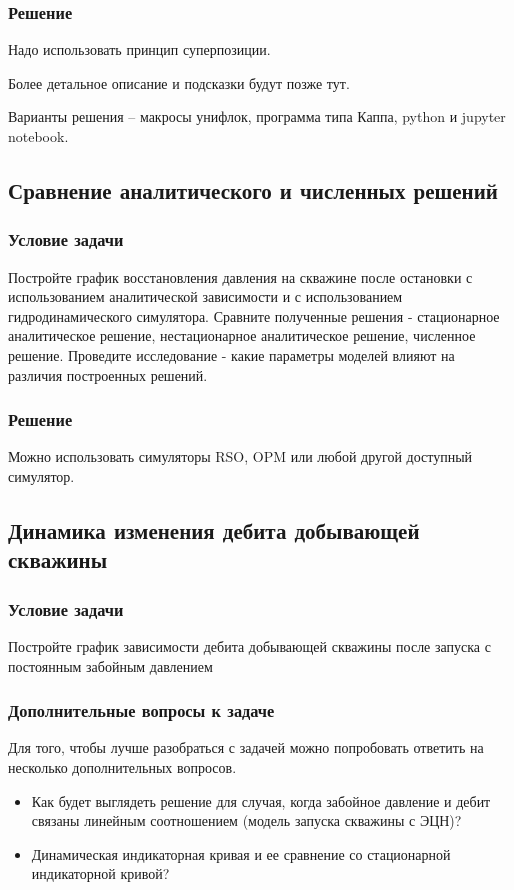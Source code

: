 \subsubsection{Решение}
	Надо использовать принцип суперпозиции.
	
	Более детальное описание и подсказки будут позже тут.
	
	Варианты решения -- макросы унифлок, программа типа Каппа, python и jupyter notebook.
	
\subsection{Сравнение аналитического и численных решений}

\subsubsection{Условие задачи}
Постройте график восстановления давления на скважине после остановки с использованием аналитической зависимости и с использованием гидродинамического симулятора. Сравните полученные решения - стационарное аналитическое решение, нестационарное аналитическое решение, численное решение. Проведите исследование - какие параметры моделей влияют на различия построенных решений.

\subsubsection{Решение}
Можно использовать симуляторы RSO, OPM или любой другой доступный симулятор.


\subsection{Динамика изменения дебита добывающей скважины}
\subsubsection{Условие задачи}
Постройте график зависимости дебита добывающей скважины после запуска с постоянным забойным давлением


\subsubsection{Дополнительные вопросы к задаче}

Для того, чтобы лучше разобраться с задачей можно попробовать ответить на несколько дополнительных вопросов.
\begin{itemize}
	\item Как будет выглядеть решение для случая, когда забойное давление и дебит связаны линейным соотношением (модель запуска скважины с ЭЦН)? 
	\item Динамическая индикаторная кривая и ее сравнение со стационарной индикаторной кривой?

\end{itemize}